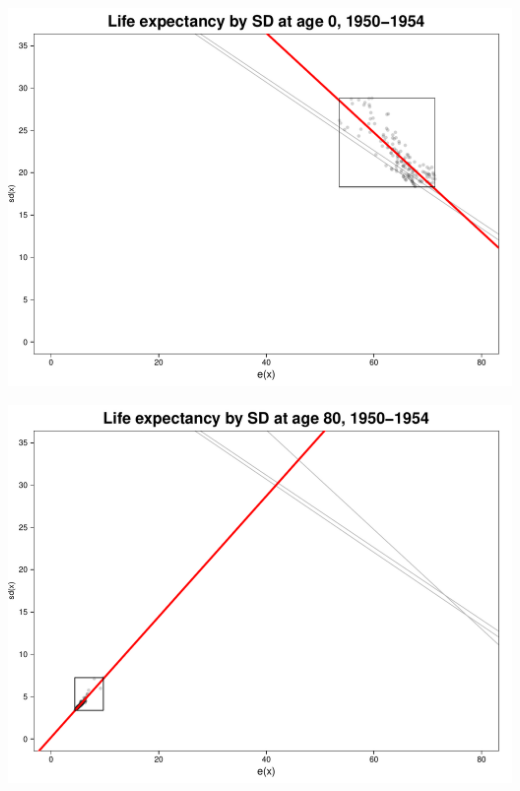 \documentclass[xcolor={dvipsnames}]{beamer}
\begin{document}
\begin{frame}
		
			\begin{center}
		\includegraphics[scale=.53]{Figures/Fig3}
				\end{center}
			
\end{frame}


\begin{frame}
		
			\begin{center}
		\includegraphics[scale=.53]{Figures/Fig4}
				\end{center}
			
\end{frame}
\end{document}

